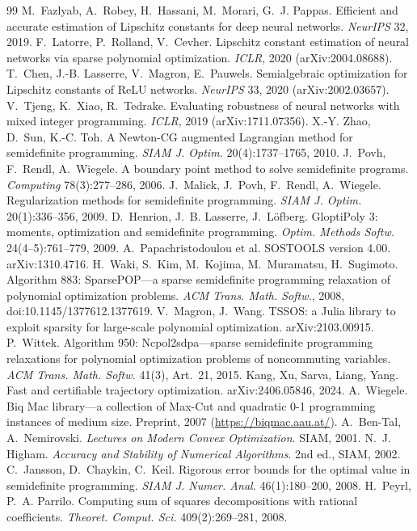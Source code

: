 \documentclass[a4paper,11pt]{article}
\theoremstyle{plain}
\theoremstyle{definition}
\theoremstyle{remark}
\begin{document}
\begin{thebibliography}{99}
 M.~Fazlyab, A.~Robey, H.~Hassani, M.~Morari, G.~J. Pappas. Efficient and accurate estimation of Lipschitz constants for deep neural networks. \emph{NeurIPS} 32, 2019.
 F.~Latorre, P.~Rolland, V.~Cevher. Lipschitz constant estimation of neural networks via sparse polynomial optimization. \emph{ICLR}, 2020 (arXiv:2004.08688).
 T.~Chen, J.-B. Lasserre, V.~Magron, E.~Pauwels. Semialgebraic optimization for Lipschitz constants of ReLU networks. \emph{NeurIPS} 33, 2020 (arXiv:2002.03657).
 V.~Tjeng, K.~Xiao, R.~Tedrake. Evaluating robustness of neural networks with mixed integer programming. \emph{ICLR}, 2019 (arXiv:1711.07356).
 X.-Y. Zhao, D.~Sun, K.-C. Toh. A Newton-CG augmented Lagrangian method for semidefinite programming. \emph{SIAM J. Optim.} 20(4):1737--1765, 2010.
 J.~Povh, F.~Rendl, A.~Wiegele. A boundary point method to solve semidefinite programs. \emph{Computing} 78(3):277--286, 2006.
 J.~Malick, J.~Povh, F.~Rendl, A.~Wiegele. Regularization methods for semidefinite programming. \emph{SIAM J. Optim.} 20(1):336--356, 2009.
 D.~Henrion, J.~B. Lasserre, J.~L\"ofberg. GloptiPoly 3: moments, optimization and semidefinite programming. \emph{Optim. Methods Softw.} 24(4--5):761--779, 2009.
 A.~Papachristodoulou et al. SOSTOOLS version 4.00. arXiv:1310.4716.
 H.~Waki, S.~Kim, M.~Kojima, M.~Muramatsu, H.~Sugimoto. Algorithm 883: SparsePOP---a sparse semidefinite programming relaxation of polynomial optimization problems. \emph{ACM Trans. Math. Softw.}, 2008, doi:10.1145/1377612.1377619.
 V.~Magron, J.~Wang. TSSOS: a Julia library to exploit sparsity for large-scale polynomial optimization. arXiv:2103.00915.
 P.~Wittek. Algorithm 950: Ncpol2sdpa---sparse semidefinite programming relaxations for polynomial optimization problems of noncommuting variables. \emph{ACM Trans. Math. Softw.} 41(3), Art.~21, 2015.
 Kang, Xu, Sarva, Liang, Yang. Fast and certifiable trajectory optimization. arXiv:2406.05846, 2024.
 A.~Wiegele. Biq Mac library---a collection of Max-Cut and quadratic 0-1 programming instances of medium size. Preprint, 2007 (\url{https://biqmac.aau.at/}).
 A.~Ben-Tal, A.~Nemirovski. \emph{Lectures on Modern Convex Optimization}. SIAM, 2001.
 N.~J. Higham. \emph{Accuracy and Stability of Numerical Algorithms}. 2nd ed., SIAM, 2002.
 C.~Jansson, D.~Chaykin, C.~Keil. Rigorous error bounds for the optimal value in semidefinite programming. \emph{SIAM J. Numer. Anal.} 46(1):180--200, 2008.
 H.~Peyrl, P.~A. Parrilo. Computing sum of squares decompositions with rational coefficients. \emph{Theoret. Comput. Sci.} 409(2):269--281, 2008.
\end{thebibliography}
\end{document}
